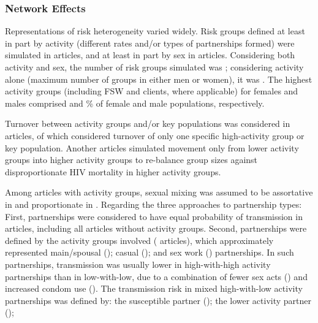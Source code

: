 \subsubsection{Network Effects}
\label{sss:res:network}
Representations of risk heterogeneity varied widely.
Risk groups defined at least in part by activity
(different rates and/or types of partnerships formed) were simulated in  articles,  %
and at least in part by sex in  articles.
Considering both activity and sex, the number of risk groups simulated was ;  %
considering activity alone (maximum number of groups in either men or women), it was .
The highest activity groups (including FSW and clients, where applicable) for females and males comprised
 and  \% of female and male populations, respectively.
\par
Turnover between activity groups and/or key populations %
was considered in  articles,
of which  considered turnover of only
one specific high-activity group or key population.
Another  articles simulated
movement only from lower activity groups into higher activity groups
to re-balance group sizes against disproportionate HIV mortality in higher activity groups.
\par
Among  articles with activity groups, sexual mixing was assumed to be
assortative in  and proportionate in .  %
Regarding the three approaches to partnership types:
First, partnerships were considered to have equal probability of transmission in
 articles, including all articles without activity groups.
Second, partnerships were defined by the activity groups involved ( articles),
which approximately represented
main/spousal ();
casual (); and
sex work () partnerships.
In such partnerships, transmission was usually
lower in high-with-high activity partnerships than in low-with-low, due to a combination of
fewer sex acts () and
increased condom use ().
The transmission risk in mixed high-with-low activity partnerships was defined by:
the susceptible partner ();
the lower activity partner ();
